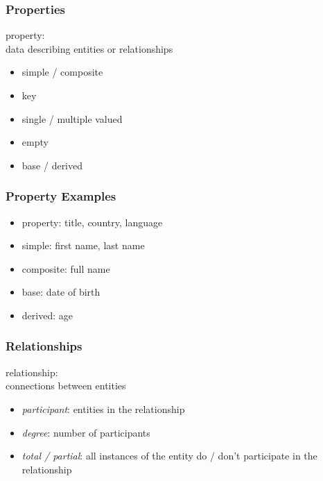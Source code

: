 \documentclass[dvipsnames]{beamer}
\begin{document}
\begin{frame}
  \frametitle{Properties}

  \begin{definition}
    \alert{property}:\\
      data describing entities or relationships

    \pause
    \begin{itemize}
      \item simple / composite
      \item key
      \item single / multiple valued
      \item empty
      \item base / derived
    \end{itemize}
  \end{definition}
\end{frame}

\begin{frame}
  \frametitle{Property Examples}

  \begin{example}
    \begin{itemize}
      \item property: title, country, language

      \pause
      \medskip
      \item simple: first name, last name
      \item composite: full name

      \pause
      \medskip
      \item base: date of birth
      \item derived: age
    \end{itemize}
  \end{example}
\end{frame}

\begin{frame}
  \frametitle{Relationships}

  \begin{definition}
    \alert{relationship}:\\
      connections between entities

    \pause
    \begin{itemize}
      \item \emph{participant}: entities in the relationship
      \item \emph{degree}: number of participants
      \item \emph{total / partial}: all instances of the entity
        do / don't participate in the relationship
    \end{itemize}
  \end{definition}
\end{frame}
\end{document}
